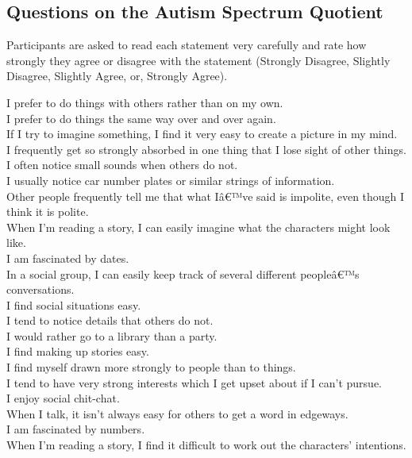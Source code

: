 \documentclass[a4paper, 11pt]{article}
\begin{document}
\newpage
\subsection{Questions on the Autism Spectrum Quotient \cite{Baron Cohen et al}} \label{AQ}

Participants are asked to read each statement very carefully and rate how strongly they agree or disagree with the statement (Strongly Disagree, Slightly Disagree, Slightly Agree, or, Strongly Agree).  \\
\hspace{1cm}

I prefer to do things with others rather than on my own.\\
I prefer to do things the same way over and over again.\\
If I try to imagine something, I find it very easy to create a picture in my mind.\\
I frequently get so strongly absorbed in one thing that I lose sight of other things.\\
I often notice small sounds when others do not.\\
I usually notice car number plates or similar strings of information.\\
Other people frequently tell me that what Iâ€™ve said is impolite, even though I think it is polite.\\
When I'm reading a story, I can easily imagine what the characters might look like.\\
I am fascinated by dates.\\
In a social group, I can easily keep track of several different peopleâ€™s conversations.\\
I find social situations easy.\\
I tend to notice details that others do not.\\
I would rather go to a library than a party.\\
I find making up stories easy.\\
I find myself drawn more strongly to people than to things.\\
I tend to have very strong interests which I get upset about if I can't pursue.\\
I enjoy social chit-chat.\\
When I talk, it isn't always easy for others to get a word in edgeways.\\
I am fascinated by numbers.\\
When I'm reading a story, I find it difficult to work out the characters' intentions.\\
\end{document}

